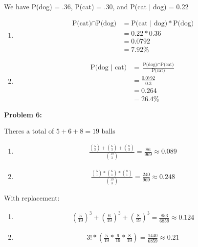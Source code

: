 \documentclass[12pt]{article}
\begin{document}
We have P(dog) = .36, P(cat) = .30, and P(cat $|$ dog) = 0.22
\begin{enumerate}
    \item[(a)]
          \begin{align*}
              \text{P(cat)} \cap{} \text{P(dog)} & = \text{P(cat $|$ dog)} * \text{P(dog)} \\
                                                 & = 0.22 * 0.36                           \\
                                                 & = 0.0792                                \\
                                                 & = 7.92\%
          \end{align*}
    \item[(b)]
          \begin{align*}
              \text{P(dog $|$ cat)} & = \frac{\text{P(dog)} \cap{} \text{P(cat)}}{\text{P(cat)}} \\
                                    & = \frac{0.0792}{0.3}                                       \\
                                    & = 0.264                                                    \\
                                    & = 26.4\%
          \end{align*}

\end{enumerate}

\noindent \textbf{Problem 6:}

Theres a total of $5+6+8 = 19$ balls
\begin{enumerate}
    \item[(a)]
          \begin{align*}
              \frac{\binom{5}{3} + \binom{6}{3} + \binom{8}{3}}{\binom{19}{3}} = \frac{86}{969} \approx{0.089}
          \end{align*}
    \item[(b)]
          \begin{align*}
              \frac{\binom{5}{1}*\binom{6}{1}*\binom{8}{1}}{\binom{19}{3}} = \frac{240}{969} \approx{0.248}
          \end{align*}

\end{enumerate}

With replacement:
\begin{enumerate}
    \item[(a)]
          \begin{align*}
              (\frac{5}{19})^3 + (\frac{6}{19})^3 + (\frac{8}{19})^3 = \frac{853}{6859} \approx{0.124}
          \end{align*}
    \item[(b)]
          \begin{align*}
              3! * (\frac{5}{19} * \frac{6}{19} * \frac{8}{19}) = \frac{1440}{6859} \approx{0.21}
          \end{align*}

\end{enumerate}
\end{document}
